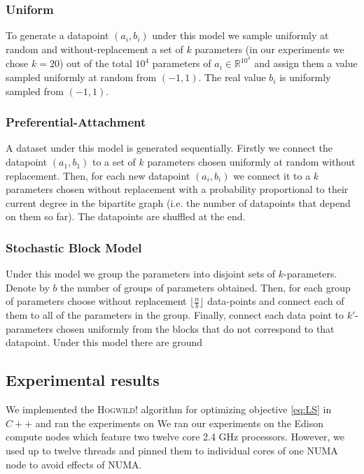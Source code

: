 \documentclass[times,11pt]{article}
\numberwithin{equation}{section}		%
\numberwithin{figure}{section}			%
\numberwithin{table}{section}				%
\newcommand{\HW}{\textsc{Hogwild!}}
\newcommand{\RR}{\mathbb{R}}
\begin{document}
\subsubsection*{Uniform}

To generate a datapoint $(a_i, b_i)$ under this model we sample uniformly at random and without-replacement a set of $k$ parameters (in our experiments we chose $k = 20$) out of the total $10^4$ parameters of $a_i\in \RR^{10^4}$ and assign them a value sampled uniformly at random from $(-1,1)$. The real value $b_i$ is uniformly sampled from $(-1,1)$. 


\subsubsection*{Preferential-Attachment}

A dataset under this model is generated sequentially. Firstly we connect the datapoint $(a_1, b_1)$ to a set of $k$ parameters chosen uniformly at random without replacement. Then, for each new datapoint $(a_i, b_i)$ we connect it to a $k$ parameters chosen without replacement with a probability proportional to their current degree in the bipartite graph (i.e. the number of datapoints that depend on them so far). The datapoints are shuffled at the end.


\subsubsection*{Stochastic Block Model}

Under this model we group the parameters into disjoint sets of $k$-parameters. Denote by $b$ the number of groups of parameters obtained. Then, for each group of parameters choose without replacement $\lfloor \frac{n}{b}\rfloor$ data-points and connect each of them to all of the parameters in the group. Finally, connect each data point to $k'$-parameters chosen uniformly from the blocks that do not correspond to that datapoint. Under this model there are ground 

\subsection{Experimental results}

We implemented the \HW{} algorithm for optimizing objective \eqref{eq:LS} in $C++$ and ran the experiments on 
We ran our experiments on the Edison compute nodes which feature two twelve core 2.4 GHz processors. 
However, we used up to twelve threads and pinned them to individual cores of one NUMA node to avoid effects of NUMA.
\end{document}
